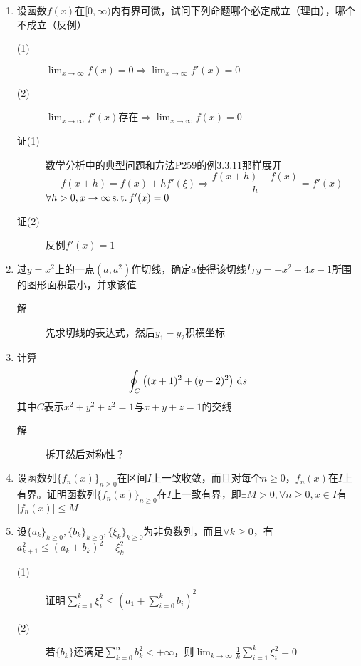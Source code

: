 \begin{enumerate}
\item 设函数$f(x)$在$[0,\infty)$内有界可微，试问下列命题哪个必定成立（理由），哪个不成立（反例）
\begin{description}
\item[(1)] $\lim_{x \to \infty}f(x)=0\Rightarrow \lim_{x \to \infty}f'(x)=0$
\item[(2)] $\lim_{x \to \infty}f'(x) $存在$\Rightarrow \lim_{x \to \infty}f(x)=0$
\item[证(1)] 数学分析中的典型问题和方法P259的例3.3.11那样展开
\[
f(x+h) = f(x) + hf'(\xi) \Rightarrow \frac{f(x+h) - f(x)}{h} = f'(x)
\]
$\forall h>0,x\to \infty \operatorname{s.t.} f'(x)=0$
\item[证(2)] 反例$f'(x)=1$
\end{description}

\item 过$y=x^2$上的一点$(a,a^2)$作切线，确定$a$使得该切线与$y=-x^2+4x-1$所围的图形面积最小，并求该值
\begin{description}
\item[解] 先求切线的表达式，然后$y_1-y_2$积横坐标
\end{description}

\item 计算%
\[
\oint_C \left((x+1)^2+(y-2)^2\right)\,\mathrm{d} s
\]
其中$C$表示$x^2+y^2+z^2=1$与$x+y+z=1$的交线
\begin{description}
\item[解] 拆开然后对称性？
\end{description}


\item 设函数列$\{f_n(x)\}_{n\geq 0}$在区间$I$上一致收敛，而且对每个$n\geq 0$，$f_n(x)$在$I$上有界。证明函数列$\{f_n(x)\}_{n\geq 0}$在$I$上一致有界，即$\exists M>0,\forall n\geq0,x\in I$有$|f_n(x)|\leq M$

\item 设$\{a_k\}_{k\geq 0},\{b_k\}_{k\geq 0},\{\xi_k\}_{k\geq 0}$为非负数列，而且$\forall k\geq 0$，有$a_{k+1}^2\leq (a_k+b_k)^2-\xi_k^2$
\begin{description}
\item[(1)] 证明$\sum_{i=1}^k\xi_i^2\leq \left(a_1+\sum_{i=0}^kb_i \right)^2$
\item[(2)] 若$\{b_k\}$还满足$\sum_{k=0}^{\infty}b_k^2<+\infty$，则$\lim_{k\to \infty}\frac{1}{k}\sum_{i=1}^k\xi_i^2=0$
\end{description}


























\end{enumerate}